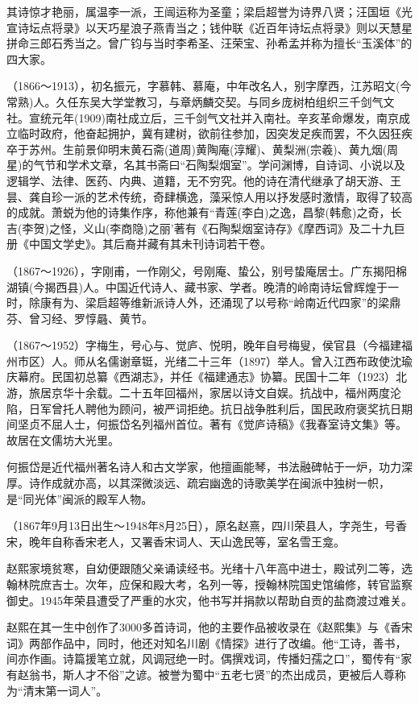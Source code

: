 \begin{description}
        其诗惊才艳丽，属温李一派，王闿运称为圣童；梁启超誉为诗界八贤；汪国垣《光宣诗坛点将录》以天巧星浪子燕青当之；钱仲联《近百年诗坛点将录》则以天慧星拼命三郎石秀当之。曾广钧与当时李希圣、汪荣宝、孙希孟并称为擅长“玉溪体”的四大家。
  \item[黄人] （1866～1913），初名振元，字慕韩、慕庵，中年改名人，别字摩西，江苏昭文(今常熟)人。久任东吴大学堂教习，与章炳麟交契。与同乡庞树柏组织三千剑气文社。宣统元年(1909)南社成立后，三千剑气文社并入南社。辛亥革命爆发，南京成立临时政府，他奋起拥护，冀有建树，欲前往参加，因突发足疾而罢，不久因狂疾卒于苏州。生前景仰明末黄石斋(道周)黄陶庵(淳耀)、黄梨洲(宗羲)、黄九烟(周星)的气节和学术文章，名其书斋曰“石陶梨烟室”。学问渊博，自诗词、小说以及逻辑学、法律、医药、内典、道籍，无不穷究。他的诗在清代继承了胡天游、王昙、龚自珍一派的艺术传统，奇肆横逸，藻采惊人用以抒发感时激情，取得了较高的成就。萧蜕为他的诗集作序，称他兼有“青莲(李白)之逸，昌黎(韩愈)之奇，长吉(李贺)之怪，义山(李商隐)之丽’著有《石陶梨烟室诗存》《摩西词》及二十九巨册《中国文学史》。其后裔并藏有其未刊诗词若干卷。
  \item[曾习经] （1867～1926），字刚甫，一作刚父，号刚庵、蛰公，别号蛰庵居士。广东揭阳棉湖镇(今揭西县)人。中国近代诗人、藏书家、学者。晚清的岭南诗坛曾辉煌于一时，除康有为、梁启超等维新派诗人外，还涌现了以号称“岭南近代四家”的梁鼎芬、曾习经、罗惇曧、黄节。
  \item[何振岱] （1867～1952）字梅生，号心与、觉庐、悦明，晚年自号梅叟，侯官县（今福建福州市区）人。师从名儒谢章铤，光绪二十三年（1897）举人。曾入江西布政使沈瑜庆幕府。民国初总纂《西湖志》，并任《福建通志》协纂。民国十二年（1923）北游，旅居京华十余载。二十五年回福州，家居以诗文自娱。抗战中，福州两度沦陷，日军曾托人聘他为顾问，被严词拒绝。抗日战争胜利后，国民政府褒奖抗日期间坚贞不屈人士，何振岱名列福州首位。著有《觉庐诗稿》《我春室诗文集》等。故居在文儒坊大光里。\par
        何振岱是近代福州著名诗人和古文学家，他擅画能琴，书法融碑帖于一炉，功力深厚。诗作成就亦高，以其深微淡远、疏宕幽逸的诗歌美学在闽派中独树一帜，是“同光体”闽派的殿军人物。
  \item[赵熙] （1867年9月13日出生～1948年8月25日），原名赵熹，四川荣县人，字尧生，号香宋，晚年自称香宋老人，又署香宋词人、天山逸民等，室名雪王龛。\par
        赵熙家境贫寒，自幼便跟随父亲诵读经书。光绪十八年高中进士，殿试列二等，选翰林院庶吉士。次年，应保和殿大考，名列一等，授翰林院国史馆编修，转官监察御史。1945年荣县遭受了严重的水灾，他书写并捐款以帮助自贡的盐商渡过难关。\par
        赵熙在其一生中创作了3000多首诗词，他的主要作品被收录在《赵熙集》与《香宋词》两部作品中，同时，他还对知名川剧《情探》进行了改编。他“工诗，善书，间亦作画。诗篇援笔立就，风调冠绝一时。偶撰戏词，传播妇孺之口”，蜀传有“家有赵翁书，斯人才不俗”之谚。被誉为蜀中“五老七贤”的杰出成员，更被后人尊称为“清末第一词人”。

\end{description}
